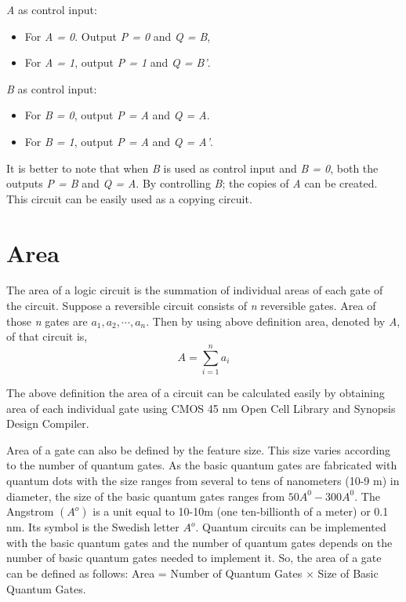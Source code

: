 \textit{A} as control input:
	\begin{itemize}
		\item { } For \textit{A = 0}. Output \textit{P = 0 }and \textit{Q = B},
		\item { } For \textit{A = 1}, output \textit{P = 1} and \textit{Q = B'}.
		
	\end{itemize}

\textit{B} as control input:
\begin{itemize}
	\item For \textit{B = 0}, output \textit{P = A} and \textit{Q = A}.
	\item For \textit{B = 1}, output \textit{P = A} and\textit{ Q = A'}.
	
\end{itemize}

It is better to note that when \textit{B} is used as control input and \textit{B = 0}, both the outputs \textit{P = B} and \textit{Q = A}. By controlling \textit{B}; the copies of \textit{A} can be created. This circuit can be easily used as a copying circuit.

\section{Area}
The area of a logic circuit is the summation of individual areas of each gate of the circuit. Suppose a reversible circuit consists of \textit{n} reversible gates. Area of those \textit{n} gates are $a_1, a_2,\cdots, a_n$. Then by using above definition area, denoted by \textit{A}, of that circuit is,
\begin{equation*}
A=\sum_{i=1}^{n}a_i
\end{equation*}

The above definition the area of a circuit can be calculated easily by obtaining area of each individual gate using CMOS 45 nm Open Cell Library and Synopsis Design Compiler. 

Area of a gate can also be defined by the feature size. This size varies according to the number of quantum gates. As the basic quantum gates are fabricated with quantum dots with the size ranges from several to tens of nanometers (10-9 m) in diameter, the size of the basic quantum gates ranges from $50A^0-300A^0$. The Angstrom $(A^o)$ is a unit equal to 10-10m (one ten-billionth of a meter) or 0.1 nm. Its symbol is the Swedish letter $A^o$. Quantum circuits can be implemented with the basic quantum gates and the number of quantum gates depends on the number of basic quantum gates needed to implement it. So, the area of a gate can be defined as follows: Area = Number of Quantum Gates $\times$ Size of Basic Quantum Gates. 

